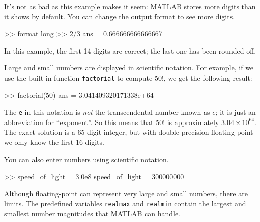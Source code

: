 \documentclass[
]{book}
\numberwithin{Answer}{chapter}
\numberwithin{Exercise}{chapter}
\begin{document}
It's not as bad as this example makes it seem: MATLAB stores more digits than it shows by default.
You can change the output format to see more digits.


\begin{code}
>> format long
>> 2/3
ans = 0.666666666666667
\end{code}

In this example, the first 14 digits are correct; the last one has been rounded off.


Large and small numbers are displayed in scientific notation.  For example, if we use the built in function {\tt factorial} to compute $50!$, we get the following result:

\begin{code}
>> factorial(50)
ans = 3.041409320171338e+64
\end{code}

The {\tt e} in this notation is {\em not} the transcendental number
known as $e$; it is just an abbreviation for ``exponent''.  So
this means that $50!$ is approximately $3.04 \times 10^{64}$.  The
exact solution is a 65-digit integer, but with double-precision floating-point 
we only know the first 16 digits.


%
%

You can also enter numbers using scientific notation.

\begin{code}
>> speed_of_light = 3.0e8
speed_of_light = 300000000
\end{code}

Although floating-point can represent very large and small numbers, 
there are limits.  
The predefined variables {\tt realmax} and {\tt realmin}
contain the largest and smallest number magnitudes that MATLAB 
can handle.
\end{document}
